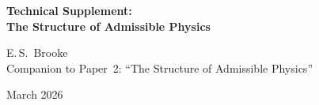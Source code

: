 \documentclass[11pt,a4paper]{article}
\theoremstyle{definition}
\begin{document}

\begin{center}
{\LARGE\bfseries Technical Supplement:\\[4pt]
The Structure of Admissible Physics}

\bigskip
{\large E.\,S.\ Brooke}\\[4pt]
{\small Companion to Paper~2: ``The Structure of Admissible Physics''}

\bigskip
{\small March 2026}
\end{center}

\bigskip


\end{document}
